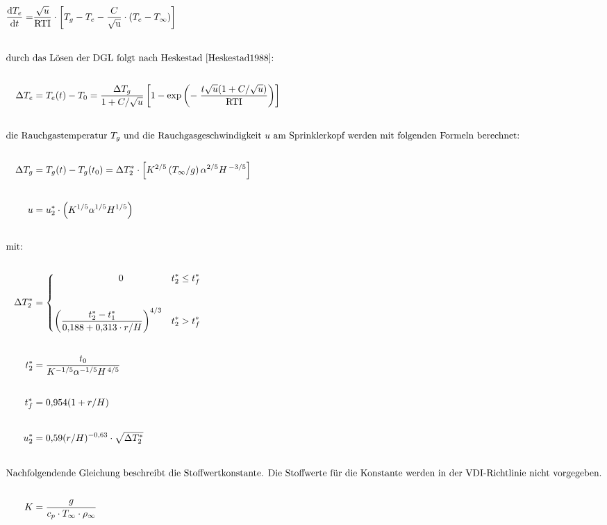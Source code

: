 \begin{align}
    \frac{\mathrm{d} T_{e}}{\mathrm{d} t}=&\frac{\sqrt{u}}{\mathrm{RTI}}\cdot \left [ T_g-T_{e}-\frac{C}{\mathrm{\sqrt{u}}}\cdot \left(T_{e}-T_{\infty}\right) \right ] \label{eq:VDISprinkleraktivierung}\\[20pt]
    \intertext{durch das Lösen der DGL folgt nach Heskestad \cite{Heskestad1988}:} \nonumber\\
    \Delta T_e &= T_e(t)-T_0=\frac{\Delta T_g}{1+C/\sqrt{u}}\left [ 1-\text{exp} \left( -\; \frac{t \sqrt{u}(1+C/\sqrt{u})}{\text{RTI}} \right ) \right ] \label{eq:3.2}\\[20pt]
    \intertext{die Rauchgastemperatur $T_g$ und die Rauchgasgeschwindigkeit $u$ am Sprinklerkopf werden mit folgenden Formeln berechnet:} \nonumber\\
    \Delta T_g&= T_g(t)-T_g(t_0)=\Delta T_{2}^{*} \cdot\left[K^{2 / 5}\left(T_{\infty} / g\right) \alpha^{2 / 5} H^{\,-3 / 5}\right] \label{eq:3.4}\\[20pt]
    u&=u^*_2\cdot \left ( K^{1/5}\alpha^{1/5}H^{1/5} \right ) \label{eq:3.3}\\[20pt]
     \intertext{mit:} \nonumber\\
     \Delta T_{2}^{*}&=
        \begin{dcases}
        {\hspace{68pt}0} &
        {t_2^* \leq t_{f}^{*}} \\[20pt]
        {\left(\frac{t_{2}^{*}-t_{1}^{*}}{0{,}188+0{,}313 \cdot r / H }\right )^{4/3}}&
{t_2^*>t_{f}^{*}}
\end{dcases} \label{eq:3.5}\\[20pt]
   t^*_2&=\frac{t_0}{K^{-1/5}\alpha^{-1/5}H^{\,4/5}} \label{eq:3.6}\\[20pt]
   t^*_f&=0{,}954(1+r/H)\label{eq:3.7}\\[20pt]
   u^*_2&=0{,}59(r/H)^{-0{,}63}\cdot \sqrt{\Delta T^*_2} \label{eq:3.8}\\[20pt]
   \intertext{Nachfolgendende Gleichung beschreibt die Stoffwertkonstante. Die Stoffwerte für die Konstante werden in der VDI-Richtlinie nicht vorgegeben.} \nonumber\\
   K&=\frac{g}{c_p\cdot T_\infty \cdot \rho_\infty}\label{eq:3.9}
\end{align}

\SuperPar

